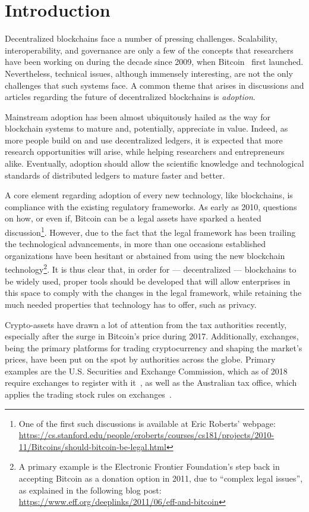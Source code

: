\section{Introduction}\label{sec:introduction}

Decentralized blockchains face a number of pressing challenges.
Scalability, interoperability, and governance are only a few of the concepts
that researchers have been working on during the decade since 2009, when
Bitcoin~\cite{nakamoto2008bitcoin} first launched. Nevertheless, technical
issues, although immensely interesting, are not the only challenges that such
systems face. A common theme that arises in discussions and articles regarding
the future of decentralized blockchains is \emph{adoption}.

Mainstream adoption has been almost ubiquitously hailed as the way for
blockchain systems to mature and, potentially, appreciate in value. Indeed, as
more people build on and use decentralized ledgers, it is expected that more
research opportunities will arise, while helping researchers and entrepreneurs
alike. Eventually, adoption should allow the scientific knowledge and
technological standards of distributed ledgers to mature faster and better.

A core element regarding adoption of every new technology, like blockchains, is
compliance with the existing regulatory frameworks. As early as 2010, questions
on how, or even if, Bitcoin can be a legal assets have sparked a heated
discussion\footnote{One of the first such discussions is available at Eric
Roberts' webpage:
\url{https://cs.stanford.edu/people/eroberts/courses/cs181/projects/2010-11/Bitcoins/should-bitcoin-be-legal.html}}.
However, due to the fact that the legal framework has been trailing the
technological advancements, in more than one occasions established
organizations have been hesitant or abstained from using the new blockchain
technology\footnote{A primary example is the Electronic Frontier Foundation's
step back in accepting Bitcoin as a donation option in 2011, due to ``complex
legal issues'', as explained in the following blog post:
\url{https://www.eff.org/deeplinks/2011/06/eff-and-bitcoin}}. It is thus clear
that, in order for --- decentralized --- blockchains to be widely used, proper
tools should be developed that will allow enterprises in this space to comply
with the changes in the legal framework, while retaining the much needed
properties that technology has to offer, such as privacy.

Crypto-assets have drawn a lot of attention from the tax authorities recently,
especially after the surge in Bitcoin's price during 2017. Additionally,
exchanges, being the primary platforms for trading cryptocurrency and shaping
the market's prices, have been put on the spot by authorities across the
globe. Primary examples are the U.S. Securities and Exchange Commission, which
as of 2018 require exchanges to register with
it~\cite{securities2018statement}, as well as the Australian tax office, which
applies the trading stock rules on exchanges~\cite{tax2019statement}.

